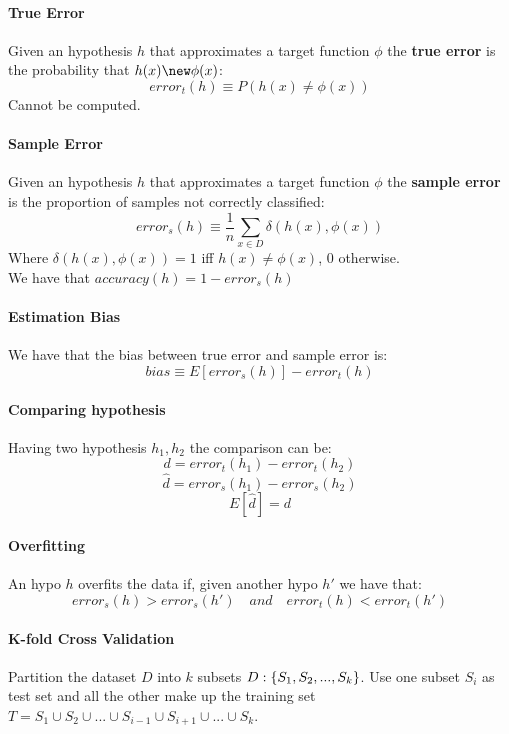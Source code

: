 \paragraph{True Error}
Given an hypothesis $h$ that approximates a target function $\phi $ the \textbf{true error} is the probability that $h(x) \new \phi(x)$:
\[error_t(h) \equiv P(h(x)\neq \phi(x))\]
Cannot be computed.

\paragraph{Sample Error}
Given an hypothesis $h$ that approximates a target function $\phi $ the \textbf{sample error} is the proportion of samples not correctly classified:
\[error_s(h) \equiv \frac{1}{n} \sum_{x \in D} \delta(h(x), \phi(x))\]
Where $\delta(h(x), \phi(x))=1$ iff $h(x) \neq \phi(x)$, 0 otherwise.\\
We have that $accuracy(h)=1- error_s(h)$

\paragraph{Estimation Bias}
We have that the bias between true error and sample error is:
\[bias \equiv E[error_s(h)]-error_t(h)\]

\paragraph{Comparing hypothesis}
Having two hypothesis $h_1,h_2$ the comparison can be:
\[d= error_t(h_1)- error_t(h_2)\]
\[\hat{d}= error_s(h_1)- error_s(h_2)\]
\[E[\hat{d}]=d\]

\paragraph{Overfitting}
An hypo $h$ overfits the data if, given another hypo $h'$ we have that:
\[error_s(h)>error_s(h')\quad and\quad error_t(h)< error_t(h')\]


\paragraph{K-fold Cross Validation}
Partition the dataset $D$ into $k$ subsets $D: \lbrace{S_1,S_2,...,S_k}\rbrace$. Use one subset $S_i$ as test set and all the other make up the training set $T=S_1 \cup S_2 \cup...\cup S_{i-1}\cup S_{i+1}\cup ...\cup S_k$.\\

